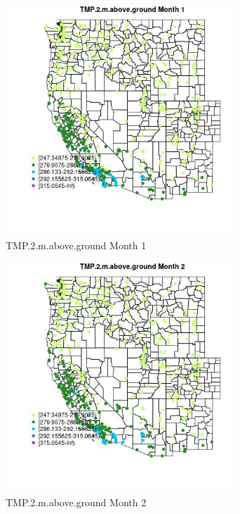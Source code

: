 \begin{figure} 
\centering  
\includegraphics[width=0.77\textwidth]{Code_Outputs/Report_ML_input_PM25_Step4_part_e_de_duplicated_aves_compiled_2019-05-14wNAs_MapObsMo1TMP2maboveground.jpg} 
\caption{\label{fig:Report_ML_input_PM25_Step4_part_e_de_duplicated_aves_compiled_2019-05-14wNAsMapObsMo1TMP2maboveground}TMP.2.m.above.ground Month 1} 
\end{figure} 
 

\begin{figure} 
\centering  
\includegraphics[width=0.77\textwidth]{Code_Outputs/Report_ML_input_PM25_Step4_part_e_de_duplicated_aves_compiled_2019-05-14wNAs_MapObsMo2TMP2maboveground.jpg} 
\caption{\label{fig:Report_ML_input_PM25_Step4_part_e_de_duplicated_aves_compiled_2019-05-14wNAsMapObsMo2TMP2maboveground}TMP.2.m.above.ground Month 2} 
\end{figure} 
 

